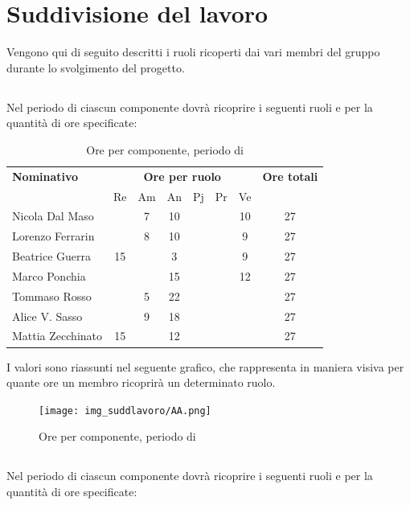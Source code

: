 \section{Suddivisione del lavoro}
Vengono qui di seguito descritti i ruoli ricoperti dai vari membri del gruppo durante lo svolgimento del progetto.
\subsection{\AR}
Nel periodo di \AR{} ciascun componente dovrà ricoprire i seguenti ruoli e per la quantità di ore specificate:

\begin{table}[H]
	\centering
	\begin{tabular}{|l|c|c|c|c|c|c|c|}
		\hline
		\textbf{Nominativo} & 
		\multicolumn{6}{c|}{\textbf{Ore per ruolo}} & 
		\textbf{Ore totali} \\
		& Re & Am & An & Pj & Pr & Ve & \\
		\hline
		Nicola Dal Maso & & 7 & 10 & & & 10 & 27 \\
		Lorenzo Ferrarin & & 8 & 10 & & & 9 & 27 \\
		Beatrice Guerra & 15 & & 3 & & & 9 & 27 \\
		Marco Ponchia & & & 15 & & & 12 & 27 \\
		Tommaso Rosso & & 5 & 22 & & & & 27 \\
		Alice V. Sasso & & 9 & 18 & & & & 27 \\
		Mattia Zecchinato & 15 & & 12 & & & & 27 \\
		\hline
	\end{tabular}
	\caption{Ore per componente, periodo di \AR{}}
\end{table}
I valori sono riassunti nel seguente grafico, che rappresenta in maniera visiva per quante ore un membro ricoprirà un determinato ruolo.
\begin{figure}[H]
	\centering
	\texttt{[image: img\_suddlavoro/AA.png]}
	\caption{Ore per componente, periodo di \AR{}}
\end{figure}


\subsection{\AD}
Nel periodo di \AD{} ciascun componente dovrà ricoprire i seguenti ruoli e per la quantità di ore specificate:

